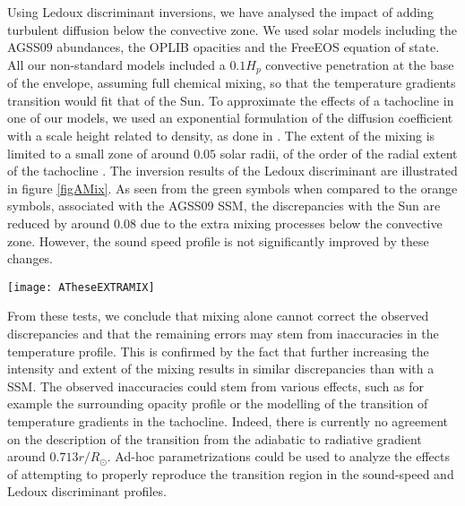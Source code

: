 \documentclass[a4paper,fleqn,usenatbib]{mnras}
\begin{document}
Using Ledoux discriminant inversions, we have analysed the impact of adding turbulent diffusion below the convective zone. We used solar models including the AGSS$09$ abundances, the OPLIB opacities and the FreeEOS equation of state. All our non-standard models included a $0.1H_{p}$ convective penetration at the base of the envelope, assuming full chemical mixing, so that the temperature gradients transition would fit that of the Sun. To approximate the effects of a tachocline in one of our models, we used an exponential formulation of the diffusion coefficient with a scale height related to density, as done in \cite{Miglio07}. The extent of the mixing is limited to a small zone of around $0.05$ solar radii, of the order of the radial extent of the tachocline \cite{corbard99}. The inversion results of the Ledoux discriminant are illustrated in figure \ref{figAMix}. As seen from the green symbols when compared to the orange symbols, associated with the AGSS09 SSM, the discrepancies with the Sun are reduced by around $0.08$ due to the extra mixing processes below the convective zone. However, the sound speed profile is not significantly improved by these changes. 

\begin{figure*}
	\centering
		\texttt{[image: ATheseEXTRAMIX]}
	\caption{Inversions of the Ledoux discriminant for models built with the FreeEOS equation of state, the OPLIB opacities and the AGSS$09$ abundances including extra mixing. The orange symbols are associated with the SSM presented in figure \ref{figASSMpapier}, the blue symbols are associated with a model including a small undershooting coefficients. The green symbols are associated with a model including a small convective penetration and an additional diffusive mixing localised below the transition in the temperature gradient. The horizontal and vertical error bars follow the definition adopted in previous figures.}
		\label{figAMix}
\end{figure*}

From these tests, we conclude that mixing alone cannot correct the observed discrepancies and that the remaining errors may stem from inaccuracies in the temperature profile. This is confirmed by the fact that further increasing the intensity and extent of the mixing results in similar discrepancies than with a SSM. The observed inaccuracies could stem from various effects, such as for example the surrounding opacity profile or the modelling of the transition of temperature gradients in the tachocline. Indeed, there is currently no agreement on the description of the transition from the adiabatic to radiative gradient around $0.713r/R_{\odot}$. Ad-hoc parametrizations could be used to analyze the effects of attempting to properly reproduce the transition region in the sound-speed and Ledoux discriminant profiles.  
\end{document}
